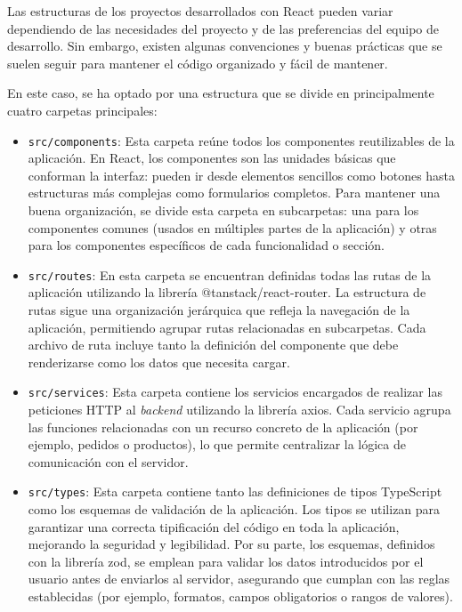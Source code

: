 Las estructuras de los proyectos desarrollados con React pueden variar dependiendo de las necesidades del proyecto y de las preferencias del equipo de desarrollo. Sin embargo, existen algunas convenciones y buenas prácticas que se suelen seguir para mantener el código organizado y fácil de mantener.

En este caso, se ha optado por una estructura que se divide en principalmente cuatro carpetas principales:

\begin{itemize}
    \item \texttt{src/components}: Esta carpeta reúne todos los componentes reutilizables de la aplicación. En React, los componentes son las unidades básicas que conforman la interfaz: pueden ir desde elementos sencillos como botones hasta estructuras más complejas como formularios completos. Para mantener una buena organización, se divide esta carpeta en subcarpetas: una para los componentes comunes (usados en múltiples partes de la aplicación) y otras para los componentes específicos de cada funcionalidad o sección.
    \item \texttt{src/routes}: En esta carpeta se encuentran definidas todas las rutas de la aplicación utilizando la librería @tanstack/react-router. La estructura de rutas sigue una organización jerárquica que refleja la navegación de la aplicación, permitiendo agrupar rutas relacionadas en subcarpetas. Cada archivo de ruta incluye tanto la definición del componente que debe renderizarse como los datos que necesita cargar.
    \item \texttt{src/services}: Esta carpeta contiene los servicios encargados de realizar las peticiones HTTP al \textit{backend} utilizando la librería axios. Cada servicio agrupa las funciones relacionadas con un recurso concreto de la aplicación (por ejemplo, pedidos o productos), lo que permite centralizar la lógica de comunicación con el servidor.
    \item \texttt{src/types}: Esta carpeta contiene tanto las definiciones de tipos TypeScript como los esquemas de validación de la aplicación. Los tipos se utilizan para garantizar una correcta tipificación del código en toda la aplicación, mejorando la seguridad y legibilidad. Por su parte, los esquemas, definidos con la librería zod, se emplean para validar los datos introducidos por el usuario antes de enviarlos al servidor, asegurando que cumplan con las reglas establecidas (por ejemplo, formatos, campos obligatorios o rangos de valores).
\end{itemize}

